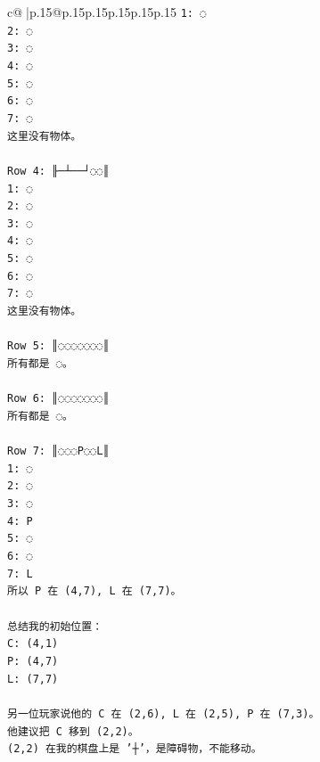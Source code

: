 \documentclass{article}
\begin{document}
{\begin{supertabular}{c@{$\;$}|p{.15\linewidth}@{}p{.15\linewidth}p{.15\linewidth}p{.15\linewidth}p{.15\linewidth}p{.15\linewidth}}
{{{\texttt{1: ◌} \\
\texttt{2: ◌} \\
\texttt{3: ◌} \\
\texttt{4: ◌} \\
\texttt{5: ◌} \\
\texttt{6: ◌} \\
\texttt{7: ◌} \\
\texttt{这里没有物体。} \\
\\ 
\texttt{Row 4: ╟─┴──┘◌◌║} \\
\texttt{1: ◌} \\
\texttt{2: ◌} \\
\texttt{3: ◌} \\
\texttt{4: ◌} \\
\texttt{5: ◌} \\
\texttt{6: ◌} \\
\texttt{7: ◌} \\
\texttt{这里没有物体。} \\
\\ 
\texttt{Row 5: ║◌◌◌◌◌◌◌║} \\
\texttt{所有都是 ◌。} \\
\\ 
\texttt{Row 6: ║◌◌◌◌◌◌◌║} \\
\texttt{所有都是 ◌。} \\
\\ 
\texttt{Row 7: ║◌◌◌P◌◌L║} \\
\texttt{1: ◌} \\
\texttt{2: ◌} \\
\texttt{3: ◌} \\
\texttt{4: P} \\
\texttt{5: ◌} \\
\texttt{6: ◌} \\
\texttt{7: L} \\
\texttt{所以 P 在 (4,7), L 在 (7,7)。} \\
\\ 
\texttt{总结我的初始位置：} \\
\texttt{C: (4,1)} \\
\texttt{P: (4,7)} \\
\texttt{L: (7,7)} \\
\\ 
\texttt{另一位玩家说他的 C 在 (2,6), L 在 (2,5), P 在 (7,3)。} \\
\texttt{他建议把 C 移到 (2,2)。} \\
\texttt{(2,2) 在我的棋盘上是 '┼'，是障碍物，不能移动。} \\
}}}
\end{supertabular}}
\end{document}
